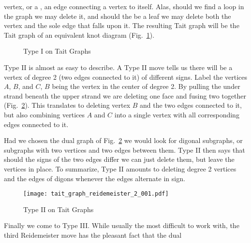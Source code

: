         vertex, or a , an edge connecting a vertex to itself. Alas,
        should we find a loop in the graph we may delete it, and should the be
        a leaf we may delete both the vertex and the sole edge that falls upon
        it. The resulting Tait graph will be the Tait graph of an equivalent
        knot diagram (Fig.~\ref{fig:tait_graph_reidemeister_1}).
        \begin{figure}
            \centering
            \caption{Type I on Tait Graphs}
            \label{fig:tait_graph_reidemeister_1}
        \end{figure}
        \par\hfill\par
        Type II is almost as easy to describe. A Type II move tells us there
        will be a vertex of degree 2 (two edges connected to it) of different
        signs. Label the vertices $A$, $B$, and $C$, $B$ being the vertex in
        the center of degree 2. By pulling the under strand beneath the upper
        strand we are deleting one face and fusing two together
        (Fig.~\ref{fig:tait_graph_reidemeister_2_001}). This translates to
        deleting vertex $B$ and the two edges connected to it, but also
        combining vertices $A$ and $C$ into a single vertex with all
        corresponding edges connected to it.
        \par\hfill\par
        Had we chosen the dual graph of
        Fig.~\ref{fig:tait_graph_reidemeister_2_001} we would look for digonal
        subgraphs, or subgraphs with two vertices and two edges between them.
        Type II then says that should the signs of the two edges differ we
        can just delete them, but leave the vertices in place. To summarize,
        Type II amounts to deleting degree 2 vertices and the edges of digons
        whenever the edges alternate in sign.
        \begin{figure}
            \centering
            \texttt{[image: tait\_graph\_reidemeister\_2\_001.pdf]}
            \caption{Type II on Tait Graphs}
            \label{fig:tait_graph_reidemeister_2_001}
        \end{figure}
        \par\hfill\par
        Finally we come to Type III. While usually the most difficult to work
        with, the third Reidemeister move has the pleasant fact that the dual

